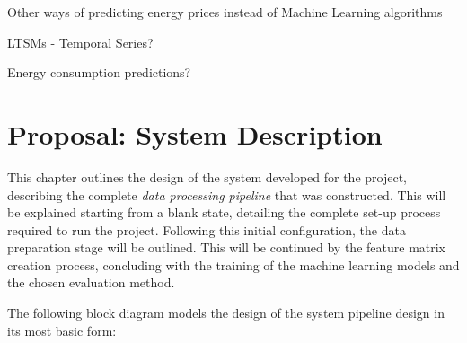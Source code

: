 \documentclass[12pt]{report} %
\begin{document}
Other ways of predicting energy prices instead of Machine Learning algorithms

LTSMs - Temporal Series?

Energy consumption predictions?





\chapter{Proposal: System Description}

This chapter outlines the design of the system developed for the project, describing the complete \textit{data processing pipeline} that was constructed. This will be explained starting from a blank state, detailing the complete set-up process required to run the project. Following this initial configuration, the data preparation stage will be outlined. This will be continued by the feature matrix creation process, concluding with the training of the machine learning models and the chosen evaluation method.

The following block diagram models the design of the system pipeline design in its most basic form:


\end{document}
